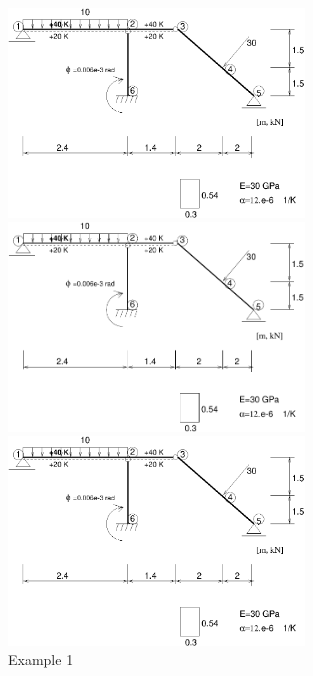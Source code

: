 \documentclass[a4paper]{article}
\begin{document}
\begin{figure}[tb]
\begin{htmlonly}
  \centerline{\includegraphics[width=0.7\textwidth]{ex01.eps}}
\end{htmlonly}
\ifpdf
\centerline{\includegraphics[width=0.7\textwidth]{ex01.pdf}}
\else
\centerline{\includegraphics[width=0.7\textwidth]{ex01.eps}}
\fi
\caption{Example 1}
\label{ex01}

\end{figure}
\end{document}

